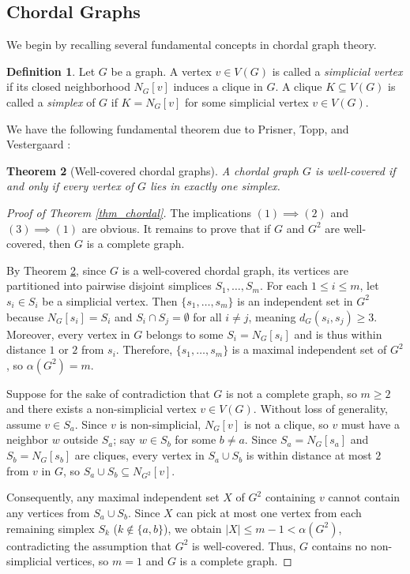 \documentclass[12pt]{amsart}
\numberwithin{equation}{section}
\newtheorem{thm}{\bf Theorem}[section]
\theoremstyle{definition}
\newtheorem{defn}[thm]{Definition}
\begin{document}
\subsection{Chordal Graphs}
We begin by recalling several fundamental concepts in chordal graph theory.

\begin{defn}
Let $G$ be a graph. A vertex $v \in V(G)$ is called a \emph{simplicial vertex} if its closed neighborhood $N_G[v]$ induces a clique in $G$. A clique $K \subseteq V(G)$ is called a \emph{simplex} of $G$ if $K = N_G[v]$ for some simplicial vertex $v \in V(G)$.
\end{defn}
We have the following fundamental theorem due to Prisner, Topp, and Vestergaard \cite{PTV}:

\begin{thm}[Well-covered chordal graphs]\label{thm_well_covered_chordal}
A chordal graph $G$ is well-covered if and only if every vertex of $G$ lies in exactly one simplex.
\end{thm}

\begin{proof}[Proof of Theorem \ref{thm_chordal}] 
The implications $(1) \implies (2)$ and $(3) \implies (1)$ are obvious. It remains to prove that if $G$ and $G^2$ are well-covered, then $G$ is a complete graph. 

By Theorem \ref{thm_well_covered_chordal}, since $G$ is a well-covered chordal graph, its vertices are partitioned into pairwise disjoint simplices $S_1, \ldots, S_m$. For each $1 \le i \le m$, let $s_i \in S_i$ be a simplicial vertex. Then $\{s_1, \ldots, s_m\}$ is an independent set in $G^2$ because $N_G[s_i] = S_i$ and $S_i \cap S_j = \emptyset$ for all $i \neq j$, meaning $d_G(s_i, s_j) \ge 3$. Moreover, every vertex in $G$ belongs to some $S_i = N_G[s_i]$ and is thus within distance $1$ or $2$ from $s_i$. Therefore, $\{s_1, \ldots, s_m\}$ is a maximal independent set of $G^2$, so $\alpha(G^2) = m$.

Suppose for the sake of contradiction that $G$ is not a complete graph, so $m \ge 2$ and there exists a non-simplicial vertex $v \in V(G)$. Without loss of generality, assume $v \in S_a$. Since $v$ is non-simplicial, $N_G[v]$ is not a clique, so $v$ must have a neighbor $w$ outside $S_a$; say $w \in S_b$ for some $b \neq a$. Since $S_a = N_G[s_a]$ and $S_b = N_G[s_b]$ are cliques, every vertex in $S_a \cup S_b$ is within distance at most $2$ from $v$ in $G$, so $S_a \cup S_b \subseteq N_{G^2}[v]$. 

Consequently, any maximal independent set $X$ of $G^2$ containing $v$ cannot contain any vertices from $S_a \cup S_b$. Since $X$ can pick at most one vertex from each remaining simplex $S_k$ ($k \notin \{a, b\}$), we obtain $|X| \le m - 1 < \alpha(G^2)$, contradicting the assumption that $G^2$ is well-covered. Thus, $G$ contains no non-simplicial vertices, so $m = 1$ and $G$ is a complete graph.
\end{proof}
\end{document}
